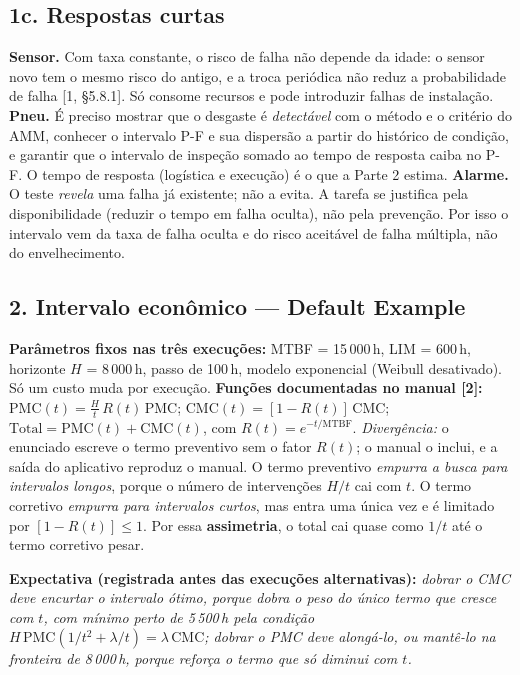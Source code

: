 \documentclass[11pt,a4paper]{article}
\begin{document}
\subsection*{1c. Respostas curtas}
\textbf{Sensor.} Com taxa constante, o risco de falha não depende da idade: o sensor novo tem o mesmo risco do antigo, e a troca periódica não reduz a probabilidade de falha [1, §5.8.1]. Só consome recursos e pode introduzir falhas de instalação.
\textbf{Pneu.} É preciso mostrar que o desgaste é \emph{detectável} com o método e o critério do AMM, conhecer o intervalo P-F e sua dispersão a partir do histórico de condição, e garantir que o intervalo de inspeção somado ao tempo de resposta caiba no P-F. O tempo de resposta (logística e execução) é o que a Parte 2 estima.
\textbf{Alarme.} O teste \emph{revela} uma falha já existente; não a evita. A tarefa se justifica pela disponibilidade (reduzir o tempo em falha oculta), não pela prevenção. Por isso o intervalo vem da taxa de falha oculta e do risco aceitável de falha múltipla, não do envelhecimento.

\subsection*{2. Intervalo econômico --- Default Example}
\textbf{Parâmetros fixos nas três execuções:} MTBF = 15\,000\,h, LIM = 600\,h, horizonte $H$ = 8\,000\,h, passo de 100\,h, modelo exponencial (Weibull desativado). Só um custo muda por execução.
\textbf{Funções documentadas no manual [2]:} $\mathrm{PMC}(t)=\frac{H}{t}\,R(t)\,\mathrm{PMC}$; $\mathrm{CMC}(t)=[1-R(t)]\,\mathrm{CMC}$; $\mathrm{Total}=\mathrm{PMC}(t)+\mathrm{CMC}(t)$, com $R(t)=e^{-t/\mathrm{MTBF}}$.
\emph{Divergência:} o enunciado escreve o termo preventivo sem o fator $R(t)$; o manual o inclui, e a saída do aplicativo reproduz o manual.
O termo preventivo \emph{empurra a busca para intervalos longos}, porque o número de intervenções $H/t$ cai com $t$. O termo corretivo \emph{empurra para intervalos curtos}, mas entra uma única vez e é limitado por $[1-R(t)]\le1$. Por essa \textbf{assimetria}, o total cai quase como $1/t$ até o termo corretivo pesar.

\textbf{Expectativa (registrada antes das execuções alternativas):} \emph{dobrar o CMC deve encurtar o intervalo ótimo, porque dobra o peso do único termo que cresce com $t$, com mínimo perto de 5\,500\,h pela condição $H\,\mathrm{PMC}(1/t^2+\lambda/t)=\lambda\,\mathrm{CMC}$; dobrar o PMC deve alongá-lo, ou mantê-lo na fronteira de 8\,000\,h, porque reforça o termo que só diminui com $t$.}
\end{document}
